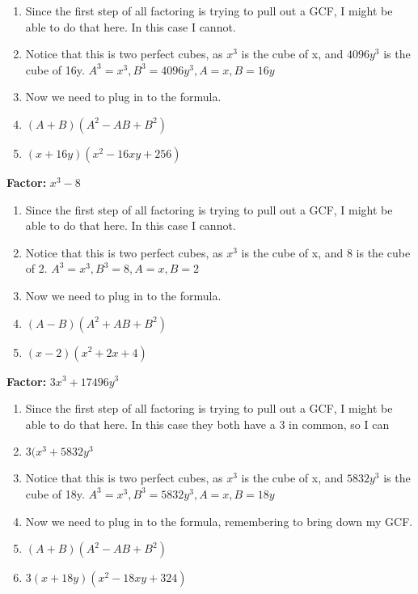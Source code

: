 \begin{enumerate}
\item Since the first step of all factoring is trying to pull out a GCF, I might be able to do that here. In this case I cannot.
\item Notice that this is two perfect cubes, as $x^{3}$ is the cube of x, and $4096y^{3}$ is the cube of 16y. $A^{3}=x^{3}, B^{3}=4096y^{3}, A=x, B=16y$
\item Now we need to plug in to the formula.
\item [] $(A+B)(A^{2}-AB+B^{2})$
\item [] $(x+16y)(x^{2}-16xy+256)$
\end{enumerate}
\textbf{Factor:} $x^{3} - 8$\\
\begin{enumerate}
\item Since the first step of all factoring is trying to pull out a GCF, I might be able to do that here. In this case I cannot.
\item Notice that this is two perfect cubes, as $x^{3}$ is the cube of x, and 8 is the cube of 2. $A^{3}=x^{3}, B^{3}=8, A=x, B=2$
\item Now we need to plug in to the formula.
\item [] $(A-B)(A^{2}+AB+B^{2})$
\item [] $(x-2)(x^{2}+2x+4)$
\end{enumerate}
\textbf{Factor:} $3x^{3} + 17496y^{3}$\\
\begin{enumerate}
\item Since the first step of all factoring is trying to pull out a GCF, I might be able to do that here. In this case they both have a 3 in common, so I can
\item [] $3(x^{3}+5832y^{3}$
\item Notice that this is two perfect cubes, as $x^{3}$ is the cube of x, and $5832y^{3}$ is the cube of 18y. $A^{3}=x^{3}, B^{3}=5832y^{3}, A=x, B=18y$
\item Now we need to plug in to the formula, remembering to bring down my GCF.
\item [] $(A+B)(A^{2}-AB+B^{2})$
\item [] $3(x+18y)(x^{2}-18xy+324)$
\end{enumerate}
